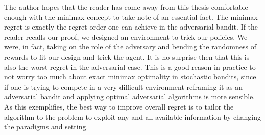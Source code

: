 \par The author hopes that the reader has come away from this thesis comfortable enough with the minimax concept to take note of an essential fact. The minimax regret is exactly the regret order one can achieve in the adversarial bandit. If the reader recalls our proof, we designed an environment to trick our policies. We were, in fact, taking on the role of the adversary and bending the randomness of rewards to fit our design and trick the agent. It is no surprise then that this is also the worst regret in the adversarial case. This is a good reason in practice to not worry too much about exact minimax optimality in stochastic bandits, since if one is trying to compete in a very difficult environment reframing it as an adversarial bandit and applying optimal adversarial algorithms is more sensible. As this exemplifies, the best way to improve overall regret is to tailor the algorithm to the problem to exploit any and all available information by changing the paradigms and setting.












































